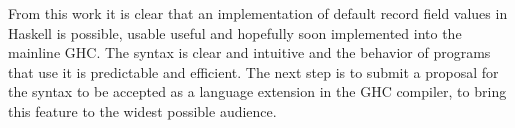 \documentclass[en]{pracamgr}
\begin{document}
From this work it is clear that an implementation of default record field values in Haskell is possible, usable useful and hopefully soon implemented
into the mainline GHC. The syntax is clear and intuitive and the behavior of programs that use it is predictable and efficient.
The next step is to submit a proposal for the syntax to be accepted as a language extension in the GHC compiler, to bring this feature to the widest possible audience.

 
\end{document}
